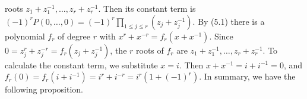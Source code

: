 roots $z_1 + z_1^{-1}, \ldots, z_r + z_r^{-1}$. Then its constant term is $(-1)^r P(0, \ldots, 0) = (-1)^r \prod_{1 \leq j \leq r} (z_j + z_j^{-1})$. By (5.1) there is a polynomial $f_r$ of degree $r$ with $x^r + x^{-r} = f_r(x + x^{-1})$. Since $0 = z_j^r + z_j^{-r} = f_r(z_j + z_j^{-1})$, the $r$ roots of $f_r$ are $z_1 + z_1^{-1}, \ldots, z_r + z_r^{-1}$. To calculate the constant term, we substitute $x = i$. Then $x + x^{-1} = i + i^{-1} = 0$, and $f_r(0) = f_r(i + i^{-1}) = i^r + i^{-r} = i^r(1 + (-1)^r)$. In summary, we have the following proposition.
